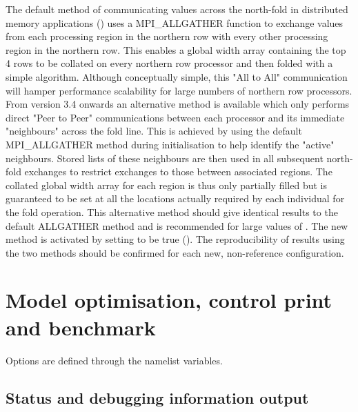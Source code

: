 \documentclass[../main/NEMO_manual]{subfiles}
\begin{document}
The default method of communicating values across the north-fold in distributed memory applications ()
uses a \textsc{MPI\_ALLGATHER} function to exchange values from each processing region in
the northern row with every other processing region in the northern row.
This enables a global width array containing the top 4 rows to be collated on every northern row processor and then
folded with a simple algorithm.
Although conceptually simple, this "All to All" communication will hamper performance scalability for
large numbers of northern row processors.
From version 3.4 onwards an alternative method is available which only performs direct "Peer to Peer" communications
between each processor and its immediate "neighbours" across the fold line.
This is achieved by using the default \textsc{MPI\_ALLGATHER} method during initialisation to
help identify the "active" neighbours.
Stored lists of these neighbours are then used in all subsequent north-fold exchanges to
restrict exchanges to those between associated regions.
The collated global width array for each region is thus only partially filled but is guaranteed to
be set at all the locations actually required by each individual for the fold operation.
This alternative method should give identical results to the default \textsc{ALLGATHER} method and
is recommended for large values of .
The new method is activated by setting  to be true ().
The reproducibility of results using the two methods should be confirmed for each new,
non-reference configuration.

\section{Model optimisation, control print and benchmark}
\label{sec:MISC_opt}

\begin{listing}
  \caption{}
  \label{lst:namctl}
\end{listing}

Options are defined through the   namelist variables.

\subsection{Status and debugging information output}
\end{document}

